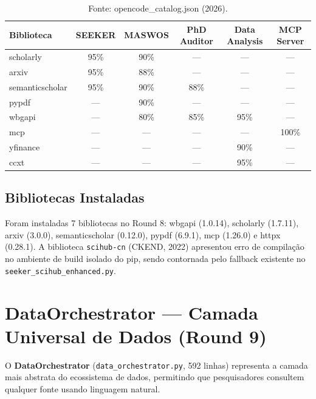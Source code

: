 \documentclass[12pt,a4paper]{article}
\begin{document}
\begin{table}[H]
  \centering
  \caption{Matriz de Afinidade — Bibliotecas $\times$ Pipelines}
  \label{tab:affinity}
  \begin{tabular}{l c c c c c}
    \toprule
    \textbf{Biblioteca} & \textbf{SEEKER} & \textbf{MASWOS} & \textbf{PhD Auditor} & \textbf{Data Analysis} & \textbf{MCP Server} \\
    \midrule
    scholarly       & 95\% & 90\% & ---   & ---   & ---   \\
    arxiv           & 95\% & 88\% & ---   & ---   & ---   \\
    semanticscholar & 95\% & 90\% & 88\%  & ---   & ---   \\
    pypdf           & ---  & 90\% & ---   & ---   & ---   \\
    wbgapi          & ---  & 80\% & 85\%  & 95\%  & ---   \\
    mcp             & ---  & ---  & ---   & ---   & 100\% \\
    yfinance        & ---  & ---  & ---   & 90\%  & ---   \\
    ccxt            & ---  & ---  & ---   & 95\%  & ---   \\
    \bottomrule
  \end{tabular}
  \caption*{\footnotesize Fonte: opencode\_catalog.json (2026).}
\end{table}

\subsection{Bibliotecas Instaladas}

Foram instaladas 7 bibliotecas no Round 8: wbgapi (1.0.14), scholarly (1.7.11), arxiv (3.0.0), semanticscholar (0.12.0), pypdf (6.9.1), mcp (1.26.0) e httpx (0.28.1). A biblioteca \texttt{scihub-cn} (CKEND, 2022) apresentou erro de compilação no ambiente de build isolado do pip, sendo contornada pelo fallback existente no \texttt{seeker\_scihub\_enhanced.py}.

\section{DataOrchestrator — Camada Universal de Dados (Round 9)}

O \textbf{DataOrchestrator} (\texttt{data\_orchestrator.py}, 592 linhas) representa a camada mais abstrata do ecossistema de dados, permitindo que pesquisadores consultem qualquer fonte usando linguagem natural.
\end{document}
